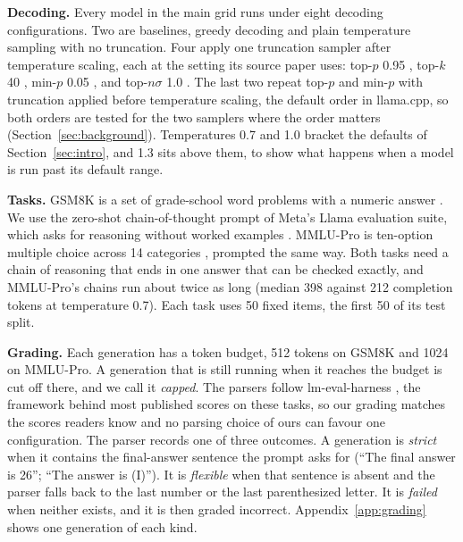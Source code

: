 \documentclass[11pt]{article}
\begin{document}
\begin{table}[t]\centering
\caption{The six runs, 232,700 graded generations in total. Every run uses both tasks with the
same 50 fixed items each and three repetitions of every sampled configuration (one for greedy
decoding), except the stratified subset, which uses 50 fresh MMLU-Pro items. ``8''
configurations are the eight described under Decoding. The main grid also includes a
16-bit GGUF run of Qwen3-4B beside its four quantized runs.}
\label{tab:design}
\footnotesize\setlength{\tabcolsep}{3pt}\resizebox{\textwidth}{!}{}
\end{table}

\textbf{Decoding.} Every model in the main grid runs under eight decoding configurations. Two
are baselines, greedy decoding and plain temperature sampling with no truncation. Four apply
one truncation sampler after temperature scaling, each at the setting its source paper uses:
top-$p$ 0.95 \citep{holtzman2020curious}, top-$k$ 40 \citep{radford2019gpt2}, min-$p$ 0.05
\citep{nguyen2024minp}, and top-$n\sigma$ 1.0 \citep{tang2024topn}. The last two repeat top-$p$
and min-$p$ with truncation applied before temperature scaling, the default order in llama.cpp,
so both orders are tested for the two samplers where the order matters
(Section~\ref{sec:background}). Temperatures 0.7 and 1.0 bracket the defaults of
Section~\ref{sec:intro}, and 1.3 sits above them, to show what happens when a model is run past
its default range.

\textbf{Tasks.} GSM8K is a set of grade-school word problems with a numeric answer
\citep{cobbe2021gsm8k}. We use the zero-shot chain-of-thought prompt of Meta's Llama evaluation
suite, which asks for reasoning without worked examples \citep{meta2024llamaevals}. MMLU-Pro is
ten-option multiple choice across 14 categories \citep{wang2024mmlupro}, prompted the same way.
Both tasks need a chain of reasoning that ends in one answer that can be checked exactly, and
MMLU-Pro's chains run about twice as long (median 398 against 212 completion tokens at
temperature 0.7). Each task uses 50 fixed items, the first 50 of its test split.

\textbf{Grading.} Each generation has a token budget, 512 tokens on GSM8K and 1024 on MMLU-Pro.
A generation that is still running when it reaches the budget is cut off there, and we call it
\emph{capped}. The parsers follow lm-eval-harness \citep{gao2023evalharness}, the framework
behind most published scores on these tasks, so our grading matches the scores readers know and
no parsing choice of ours can favour one configuration. The parser records one of three
outcomes. A generation is \emph{strict} when it contains the final-answer sentence the prompt
asks for (``The final answer is 26''; ``The answer is (I)''). It is \emph{flexible} when that
sentence is absent and the parser falls back to the last number or the last parenthesized
letter. It is \emph{failed} when neither exists, and it is then graded incorrect.
Appendix~\ref{app:grading} shows one generation of each kind.
\end{document}
